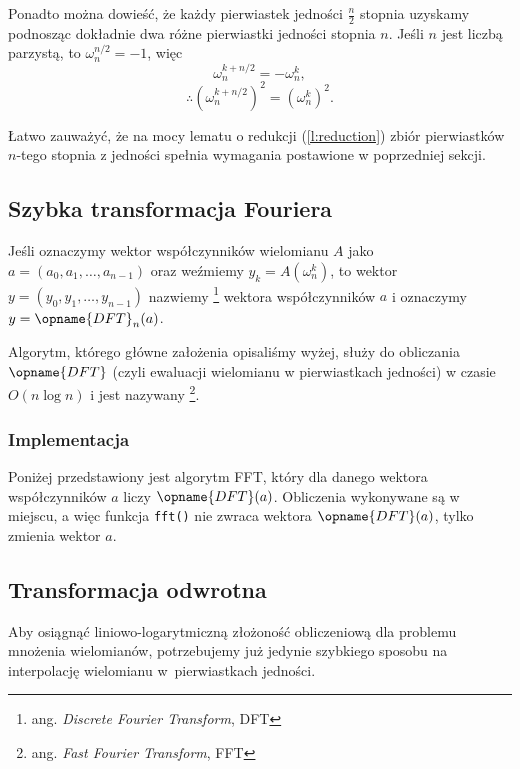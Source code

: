 \documentclass[11pt]{scrartcl}
\begin{document}
    Ponadto można dowieść, że każdy pierwiastek jedności $\frac{n}{2}$ stopnia uzyskamy podnosząc dokładnie dwa różne pierwiastki jedności stopnia $n$. Jeśli $n$ jest liczbą parzystą, to $\omega_n^{n/2} = -1$, więc
    $$ \omega_n^{k+n/2} = -\omega_n^k, $$
    $$ \therefore (\omega_n^{k+n/2})^2 = (\omega_n^k)^2. $$

    Łatwo zauważyć, że na mocy lematu o redukcji (\ref{l:reduction}) zbiór pierwiastków $n$-tego stopnia z jedności spełnia wymagania postawione w poprzedniej sekcji.

    \subsection{Szybka transformacja Fouriera}
    Jeśli oznaczymy wektor współczynników wielomianu $A$ jako $a = (a_0, a_1, \ldots, a_{n-1})$ oraz weźmiemy $y_k = A(\omega_n^k)$, to wektor $y = (y_0, y_1, \ldots, y_{n-1})$ nazwiemy \footnote{ang. \textit{Discrete Fourier Transform}, DFT} wektora współczynników $a$ i oznaczymy $y = \opname{DFT}_n(a)$.

    Algorytm, którego główne założenia opisaliśmy wyżej, służy do obliczania $\opname{DFT}$ (czyli ewaluacji wielomianu w pierwiastkach jedności) w czasie $O(n\log n)$ i jest nazywany \footnote{ang. \textit{Fast Fourier Transform}, FFT}.

    \subsubsection{Implementacja}
    Poniżej przedstawiony jest algorytm FFT, który dla danego wektora współczynników $a$ liczy $\opname{DFT}(a)$. Obliczenia wykonywane są w miejscu, a więc funkcja \lstinline{fft()} nie zwraca wektora $\opname{DFT}(a)$, tylko zmienia wektor $a$.
    

    \subsection{Transformacja odwrotna}
    Aby osiągnąć liniowo-logarytmiczną złożoność obliczeniową dla problemu mnożenia wielomianów, potrzebujemy już jedynie szybkiego sposobu na interpolację wielomianu w~pierwiastkach jedności.
\end{document}
